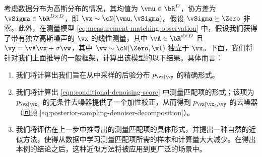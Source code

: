 \documentclass[../../book-main_zh.tex]{subfiles}
\begin{document}
\begin{example}\label{example:denoising-conditional-gaussian}
    考虑数据分布为高斯分布的情况，其均值为 $\vmu \in \bR^D$，协方差为 $\vSigma \in \bR^{D \times D}$，即 $\vx \sim \cN(\vmu, \vSigma)$。假设 $\vSigma \succeq \Zero$ 非零。此外，在测量模型 \eqref{eq:measurement-matching-observation} 中，假设我们获得了带有独立高斯噪声的 $\vx$ 的线性测量，其中 $\vA \in \bR^{d \times D}$ 且 $\vy = \vA \vx + \sigma \vw$，其中 $\vw \sim \cN(\Zero, \vI)$ 独立于 $\vx$。下面，我们将针对我们上面推导的一般框架，计算出该模型的以下结果。具体而言：
    \begin{enumerate}
        \item 我们将计算出我们旨在从中采样的后验分布 $p_{\vx \mid \vy}$ 的精确形式。
        \item 我们将计算出 \eqref{eqn:conditional-denoising-score} 中测量匹配项的形式；该项为 $p_{\vx \mid
            \vx_t}$ 的无条件去噪器提供了一个加性校正，从而得到 $p_{\vx \mid \vx_t, \vy}$ 的去噪器（回顾
            \eqref{eq:posterior-sampling-denoiser-decomposition}）。
        \item 我们将评估在上一步中推导出的测量匹配项的具体形式，并提出一种自然的近似方法，使得从数据中学习测量匹配项所需的样本和计算量大大减少。在得出本例的结论之后，这种近似方法将被应用到更广泛的场景中。
    \end{enumerate}


\end{example}
\end{document}
